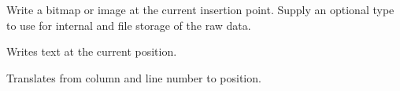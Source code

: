 

Write a bitmap or image at the current insertion point. Supply an optional type to use
for internal and file storage of the raw data.

\label{wxrichtextctrlwritetext}


Writes text at the current position.

\label{wxrichtextctrlxytoposition}


Translates from column and line number to position.


